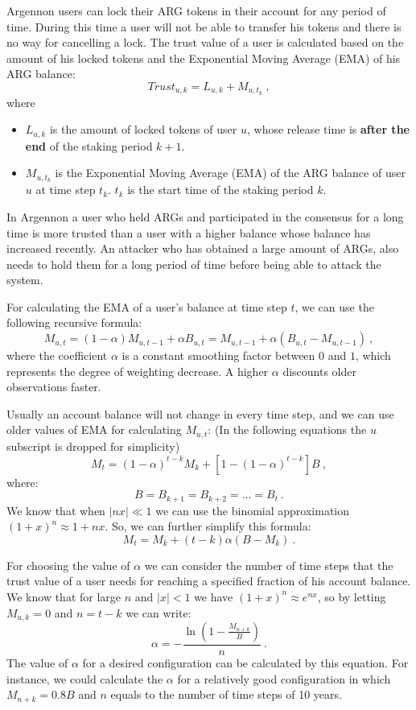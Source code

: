 Argennon users can lock their ARG tokens in their account for any period of time. During this time a user
will not be able to transfer his tokens and there is no way for cancelling a lock.
The trust value of a user is calculated based on the amount of his locked tokens and the
Exponential Moving Average (EMA) of his ARG balance:
\begin{equation}
    Trust_{u,k} = L_{u,k} + M_{u,t_k}\ ,\label{eq:trust}
\end{equation}
where
\begin{itemize}
    \item $L_{u,k}$ is the amount of locked tokens of user $u$, whose release time is \textbf{after the end} of
    the staking period $k+1$.
    \item $M_{u,t_k}$ is the Exponential Moving Average (EMA) of the ARG balance of user \(u\) at time step \(t_k\).
    $t_k$ is the start time of the staking period $k$.
\end{itemize}

In Argennon a user who held ARGs and participated in the consensus for a long time is more trusted
than a user with a higher balance whose balance has increased recently. An attacker who has obtained a large
amount of ARGs, also needs to hold them for a long period of time before being able to attack the system.

For calculating the EMA of a user's balance at time step \(t\), we can use the following
recursive formula:
\[
    M_{u,t} = (1 - \alpha) M_{u,t-1} + \alpha B_{u,t} = M_{u,t-1} + \alpha (B_{u,t} - M_{u,t-1})\ ,
\]
where the coefficient \(\alpha\) is a constant smoothing factor between \(0\) and \(1\), which represents the
degree of weighting decrease. A higher \(\alpha\) discounts older observations faster.

Usually an account balance will not change in every time step, and we can use older values of EMA for calculating
\(M_{u,t}\): (In the following equations the \(u\) subscript is dropped for simplicity)
\[
    M_{t} = (1 - \alpha)^{t-k}M_{k} + [1 - (1 - \alpha)^{t - k}]B\ ,
\]
where:
\[
    B = B_{k+1} = B_{k+2} = \dots = B_{t}\ .
\]
We know that when \(|nx| \ll 1\) we can use the binomial approximation \({(1 + x)^n \approx 1 + nx}\). So, we can
further simplify this formula:
\[
    M_{t} = M_{k} + (t - k) \alpha (B - M_{k})\ .
\]

For choosing the value of \(\alpha\) we can consider the number of time steps that the trust value of a user needs
for reaching a specified fraction of his account balance. We know that for large \(n\) and \(|x| < 1\) we have
\((1 + x)^n \approx e^{nx}\), so by letting \(M_{u,k} = 0\) and \(n = t - k\) we can write:
\begin{equation}
    \alpha =- \frac{\ln\left(1 - \frac{M_{n+k}}{B}\right)}{n}\ .\label{eq:alpha}
\end{equation}
The value of \(\alpha\) for a desired configuration can be calculated by this equation. For instance, we could
calculate the \(\alpha\) for a relatively good configuration in which \(M_{n+k} = 0.8B\) and \(n\) equals to the
number of time steps of 10 years.


